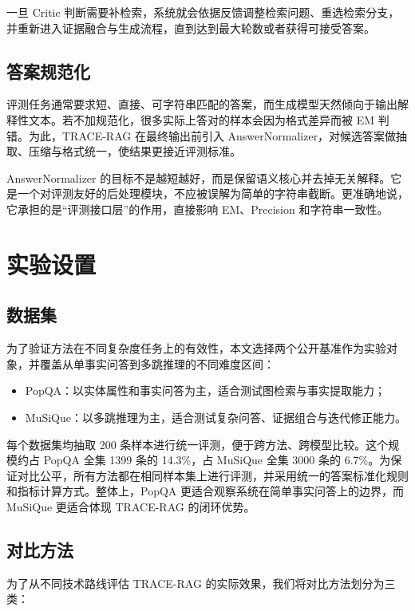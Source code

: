 ﻿\documentclass[UTF8,11pt,twocolumn]{ctexart}
\begin{document}
一旦 Critic 判断需要补检索，系统就会依据反馈调整检索问题、重选检索分支，并重新进入证据融合与生成流程，直到达到最大轮数或者获得可接受答案。

\subsection{答案规范化}

评测任务通常要求短、直接、可字符串匹配的答案，而生成模型天然倾向于输出解释性文本。若不加规范化，很多实际上答对的样本会因为格式差异而被 EM 判错。为此，TRACE-RAG 在最终输出前引入 AnswerNormalizer，对候选答案做抽取、压缩与格式统一，使结果更接近评测标准。

AnswerNormalizer 的目标不是越短越好，而是保留语义核心并去掉无关解释。它是一个对评测友好的后处理模块，不应被误解为简单的字符串截断。更准确地说，它承担的是“评测接口层”的作用，直接影响 EM、Precision 和字符串一致性。

\section{实验设置}

\subsection{数据集}

为了验证方法在不同复杂度任务上的有效性，本文选择两个公开基准作为实验对象，并覆盖从单事实问答到多跳推理的不同难度区间：

\begin{itemize}[leftmargin=1.5em]
  \item PopQA：以实体属性和事实问答为主，适合测试图检索与事实提取能力；
  \item MuSiQue：以多跳推理为主，适合测试复杂问答、证据组合与迭代修正能力。
\end{itemize}

每个数据集均抽取 200 条样本进行统一评测，便于跨方法、跨模型比较。这个规模约占 PopQA 全集 1399 条的 14.3\%，占 MuSiQue 全集 3000 条的 6.7\%。为保证对比公平，所有方法都在相同样本集上进行评测，并采用统一的答案标准化规则和指标计算方式。整体上，PopQA 更适合观察系统在简单事实问答上的边界，而 MuSiQue 更适合体现 TRACE-RAG 的闭环优势。

\subsection{对比方法}

为了从不同技术路线评估 TRACE-RAG 的实际效果，我们将对比方法划分为三类：
\end{document}
